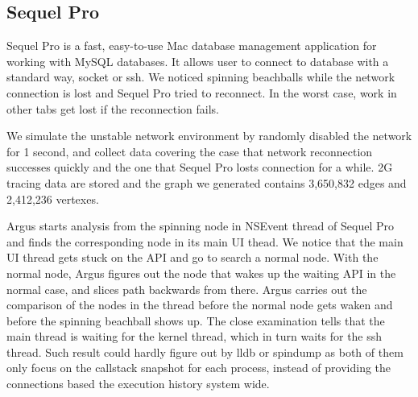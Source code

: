 \subsection{Sequel Pro}

Sequel Pro is a fast, easy-to-use Mac database management application for
working with MySQL databases. It allows user to connect to database with a
standard way, socket or ssh. We noticed spinning beachballs while the network
connection is lost and Sequel Pro tried to reconnect. In the worst case, work in
other tabs get lost if the reconnection fails.

We simulate the unstable network environment by randomly disabled the network
for 1 second, and collect data covering the case that network reconnection
successes quickly and the one that Sequel Pro losts connection for a while. 2G
tracing data are stored and the graph we generated contains 3,650,832 edges
and 2,412,236 vertexes.

Argus starts analysis from the spinning node in NSEvent thread of Sequel Pro
and finds the corresponding node in its main UI thead. We notice that the main
UI thread gets stuck on the API and go to search a normal node. With the normal
node, Argus figures out the node that wakes up the waiting API in the normal
case, and slices path backwards from there. Argus carries out the comparison
of the nodes in the thread before the normal node gets waken and before the
spinning beachball shows up. The close examination tells that the main thread
is waiting for the kernel thread, which in turn waits for the ssh thread. Such
result could hardly figure out by lldb or spindump as both of them only focus
on the callstack snapshot for each process, instead of providing the connections
based the execution history system wide.

